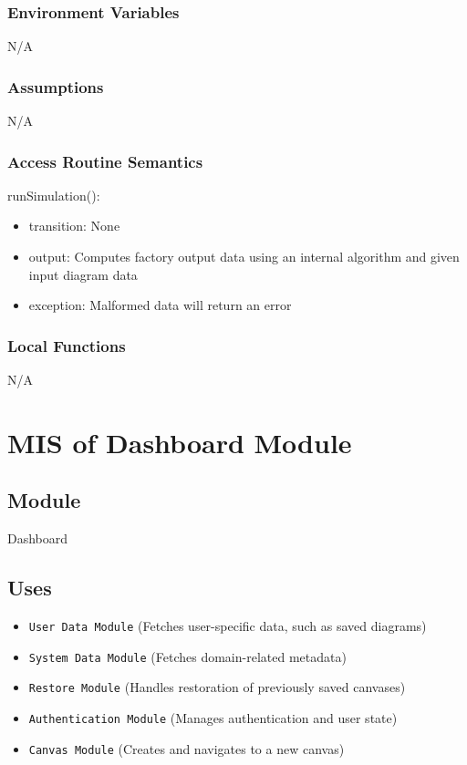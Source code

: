 \documentclass[12pt, titlepage]{article}
\begin{document}
\subsubsection{Environment Variables}

N/A

\subsubsection{Assumptions}

N/A

\subsubsection{Access Routine Semantics}

\noindent runSimulation():
\begin{itemize}
\item transition: None
\item output: Computes factory output data using an internal algorithm and given input diagram data
\item exception: Malformed data will return an error
\end{itemize}


\subsubsection{Local Functions}

N/A

\newpage
\section{MIS of Dashboard Module} \label{Module}

\subsection{Module}
Dashboard

\subsection{Uses}

\begin{itemize}
  \item \texttt{User Data Module} (Fetches user-specific data, such as saved diagrams)
  \item \texttt{System Data Module} (Fetches domain-related metadata)
  \item \texttt{Restore Module} (Handles restoration of previously saved canvases)
  \item \texttt{Authentication Module} (Manages authentication and user state)
  \item \texttt{Canvas Module} (Creates and navigates to a new canvas)
\end{itemize}
\end{document}
